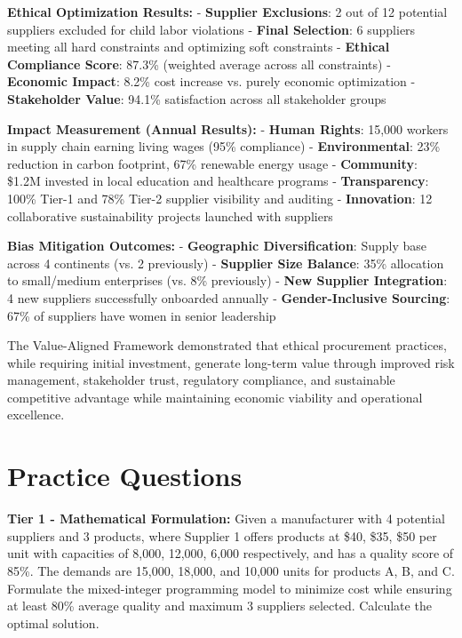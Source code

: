 \documentclass{article}
\begin{document}
\textbf{Ethical Optimization Results:}
- \textbf{Supplier Exclusions}: 2 out of 12 potential suppliers excluded for child labor violations
- \textbf{Final Selection}: 6 suppliers meeting all hard constraints and optimizing soft constraints
- \textbf{Ethical Compliance Score}: 87.3\% (weighted average across all constraints)
- \textbf{Economic Impact}: 8.2\% cost increase vs. purely economic optimization
- \textbf{Stakeholder Value}: 94.1\% satisfaction across all stakeholder groups

\textbf{Impact Measurement (Annual Results):}
- \textbf{Human Rights}: 15,000 workers in supply chain earning living wages (95\% compliance)
- \textbf{Environmental}: 23\% reduction in carbon footprint, 67\% renewable energy usage
- \textbf{Community}: \$1.2M invested in local education and healthcare programs
- \textbf{Transparency}: 100\% Tier-1 and 78\% Tier-2 supplier visibility and auditing
- \textbf{Innovation}: 12 collaborative sustainability projects launched with suppliers

\textbf{Bias Mitigation Outcomes:}
- \textbf{Geographic Diversification}: Supply base across 4 continents (vs. 2 previously)  
- \textbf{Supplier Size Balance}: 35\% allocation to small/medium enterprises (vs. 8\% previously)
- \textbf{New Supplier Integration}: 4 new suppliers successfully onboarded annually
- \textbf{Gender-Inclusive Sourcing}: 67\% of suppliers have women in senior leadership

The Value-Aligned Framework demonstrated that ethical procurement practices, while requiring initial investment, generate long-term value through improved risk management, stakeholder trust, regulatory compliance, and sustainable competitive advantage while maintaining economic viability and operational excellence.

\section{Practice Questions}

\textbf{Tier 1 - Mathematical Formulation:}
Given a manufacturer with 4 potential suppliers and 3 products, where Supplier 1 offers products at \$40, \$35, \$50 per unit with capacities of 8,000, 12,000, 6,000 respectively, and has a quality score of 85\%. The demands are 15,000, 18,000, and 10,000 units for products A, B, and C. Formulate the mixed-integer programming model to minimize cost while ensuring at least 80\% average quality and maximum 3 suppliers selected. Calculate the optimal solution.
\end{document}
